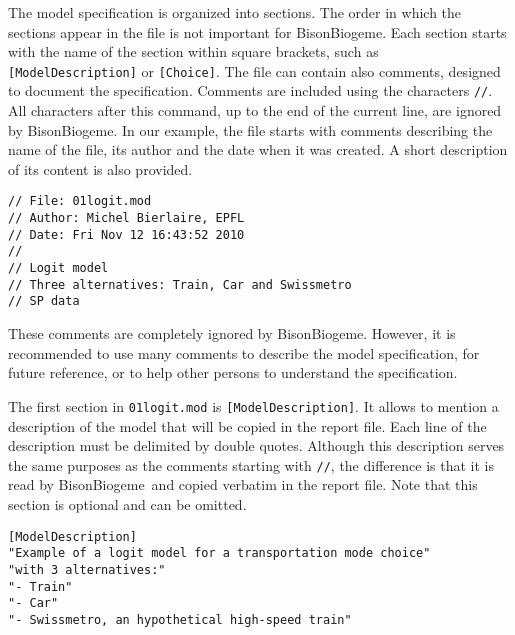 \documentclass[12pt,a4paper]{article}
\newcommand{\BBIOGEME}{BisonBiogeme}
\begin{document}
The model specification is organized into sections. The order in which
the sections appear in the file is not important for \BBIOGEME. Each section
starts with the name of the section within square brackets, such as
\lstinline$[ModelDescription]$ or \lstinline$[Choice]$. The file can
contain also comments, designed to document the specification. 
Comments are included using the characters \verb+//+. All characters
after this command, up to the end of the current line, are ignored by \BBIOGEME.
In our example, the file starts with comments describing the name of
the file, its author and the date when it was created. A short
description of its content is also provided. 
\begin{lstlisting}[style=nonumbers]
// File: 01logit.mod
// Author: Michel Bierlaire, EPFL
// Date: Fri Nov 12 16:43:52 2010
//
// Logit model
// Three alternatives: Train, Car and Swissmetro
// SP data
\end{lstlisting}
These comments are
completely ignored by \BBIOGEME. However, it is recommended to use
many comments to describe the model specification, for future
reference, or to help other persons to understand the specification. 

The first section in \lstinline$01logit.mod$ is
\lstinline$[ModelDescription]$.  It allows to mention a description of
the model that will be copied in the report file. Each line of the
description must be delimited by double quotes. Although this
description serves the same purposes as the comments starting with
\lstinline$//$, the difference is that it is read by \BBIOGEME\ and
copied verbatim in the report file. Note that this section is optional
and can be omitted.

\begin{lstlisting}[style=nonumbers]
[ModelDescription]
"Example of a logit model for a transportation mode choice"
"with 3 alternatives:"
"- Train"
"- Car"
"- Swissmetro, an hypothetical high-speed train"
\end{lstlisting}
\end{document}
